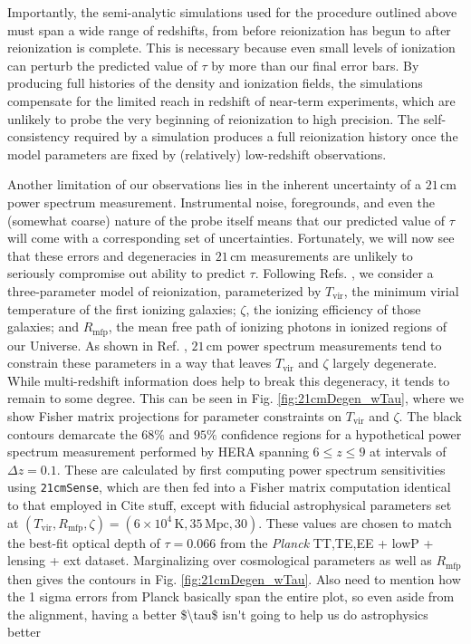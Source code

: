 \documentclass[twocolumn,aps,prd,nofootinbib,showpacs]{revtex4-1}
\begin{document}
Importantly, the semi-analytic simulations used for the procedure outlined above must span a wide range of redshifts, from before reionization has begun to after reionization is complete. This is necessary because even small levels of ionization can perturb the predicted value of $\tau$ by more than our final error bars. By producing full histories of the density and ionization fields, the simulations compensate for the limited reach in redshift of near-term experiments, which are unlikely to probe the very beginning of reionization to high precision. The self-consistency required by a simulation produces a full reionization history once the model parameters are fixed by (relatively) low-redshift observations.

Another limitation of our observations lies in the inherent uncertainty of a $21\,\textrm{cm}$ power spectrum measurement. Instrumental noise, foregrounds, and even the (somewhat coarse) nature of the probe itself means that our predicted value of $\tau$ will come with a corresponding set of uncertainties. Fortunately, we will now see that these errors and degeneracies in $21\,\textrm{cm}$ measurements are unlikely to seriously compromise out ability to predict $\tau$. Following Refs. \cite{mesinger_et_al2012,pober_et_al2014}, we consider a three-parameter model of reionization, parameterized by $T_\textrm{vir}$, the minimum virial temperature of the first ionizing galaxies; $\zeta$, the ionizing efficiency of those galaxies; and $R_\textrm{mfp}$, the mean free path of ionizing photons in ionized regions of our Universe. As shown in Ref. \cite{pober_et_al2014}, $21\,\textrm{cm}$ power spectrum measurements tend to constrain these parameters in a way that leaves $T_\textrm{vir}$ and $\zeta$ largely degenerate. While multi-redshift information does help to break this degeneracy, it tends to remain to some degree. This can be seen in Fig. \ref{fig:21cmDegen_wTau}, where we show Fisher matrix projections for parameter constraints on $T_\textrm{vir}$ and $\zeta$. The black contours demarcate the $68\%$ and $95\%$ confidence regions for a hypothetical power spectrum measurement performed by HERA spanning $6 \leq z \leq 9$ at intervals of $\Delta z = 0.1$. These are calculated by first computing power spectrum sensitivities using {\tt 21cmSense}, which are then fed into a Fisher matrix computation identical to that employed in \acl{Cite stuff}, except with fiducial astrophysical parameters set at $(T_\textrm{vir}, R_\textrm{mfp}, \zeta) = (6 \times 10^4\,\textrm{K}, 35\,\textrm{Mpc}, 30)$. These values are chosen to match the best-fit optical depth of $\tau =0.066$ from the \emph{Planck} TT,TE,EE + lowP + lensing + ext dataset. Marginalizing over cosmological parameters as well as $R_\textrm{mfp}$ then gives the contours in Fig. \ref{fig:21cmDegen_wTau}. \acl{Also need to mention how the 1 sigma errors from Planck basically span the entire plot, so even aside from the alignment, having a better $\tau$ isn't going to help us do astrophysics better}
\end{document}
